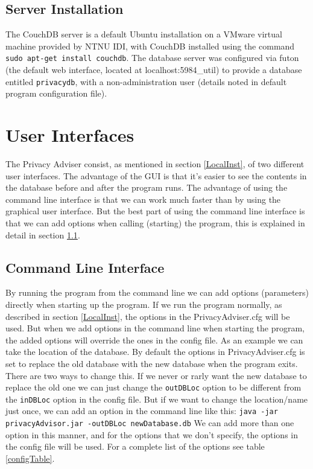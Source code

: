 \subsection{Server Installation}
The CouchDB server is a default Ubuntu installation on a VMware virtual machine provided by NTNU IDI, with CouchDB installed using the command \texttt{sudo apt-get install couchdb}. The database server was configured via futon (the default web interface, located at localhost:5984\/\_util) to provide a database entitled \texttt{privacydb}, with a non-administration user (details noted in default program configuration file).

\section{User Interfaces}
The Privacy Adviser consist, as mentioned in section \ref{LocalInst}, of two different user interfaces. The advantage of the GUI is that it's easier to see the contents in the database before and after the program runs. The advantage of using the command line interface is that we can work much faster than by using the graphical user interface. But the best part of using the command line interface is that we can add options when calling (starting) the program, this is explained in detail in section \ref{cliExplained}.

\subsection{Command Line Interface} \label{cliExplained}
By running the program from the command line we can add options (parameters) directly when starting up the program. If we run the program normally, as described in section \ref{LocalInst}, the options in the PrivacyAdviser.cfg will be used. But when we add options in the command line when starting the program, the added options will override the ones in the config file.
As an example we can take the location of the database. By default the options in PrivacyAdviser.cfg is set to replace the old database with the new database when the program exits. There are two ways to change this. If we never or rarly want the new database to replace the old one we can just change the \texttt{outDBLoc} option to be different from the \texttt{inDBLoc} option in the config file. But if we want to change the location/name just once, we can add an option in the command line like this:
\texttt{java -jar privacyAdvisor.jar -outDBLoc newDatabase.db}
We can add more than one option in this manner, and for the options that we don't specify, the options in the config file will be used. For a complete list of the options see table \ref{configTable}.

